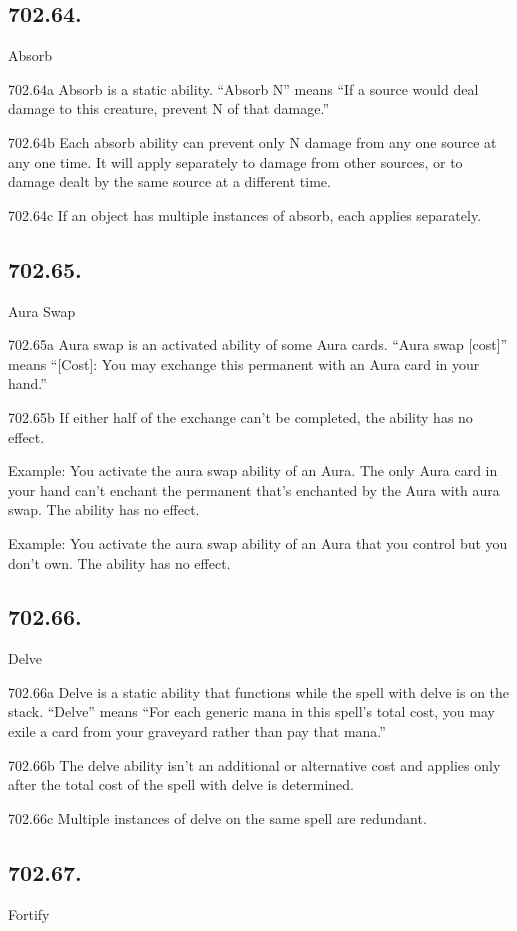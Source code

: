 \subsection*{702.64.}
Absorb

702.64a Absorb is a static ability. “Absorb N” means “If a source would deal damage to this creature, prevent N of that damage.”

702.64b Each absorb ability can prevent only N damage from any one source at any one time. It will apply separately to damage from other sources, or to damage dealt by the same source at a different time.

702.64c If an object has multiple instances of absorb, each applies separately.

\subsection*{702.65.}
Aura Swap

702.65a Aura swap is an activated ability of some Aura cards. “Aura swap [cost]” means “[Cost]: You may exchange this permanent with an Aura card in your hand.”

702.65b If either half of the exchange can’t be completed, the ability has no effect.

Example: You activate the aura swap ability of an Aura. The only Aura card in your hand can’t enchant the permanent that’s enchanted by the Aura with aura swap. The ability has no effect.

Example: You activate the aura swap ability of an Aura that you control but you don’t own. The ability has no effect.

\subsection*{702.66.}
Delve

702.66a Delve is a static ability that functions while the spell with delve is on the stack. “Delve” means “For each generic mana in this spell’s total cost, you may exile a card from your graveyard rather than pay that mana.”

702.66b The delve ability isn’t an additional or alternative cost and applies only after the total cost of the spell with delve is determined.

702.66c Multiple instances of delve on the same spell are redundant.

\subsection*{702.67.}
Fortify

